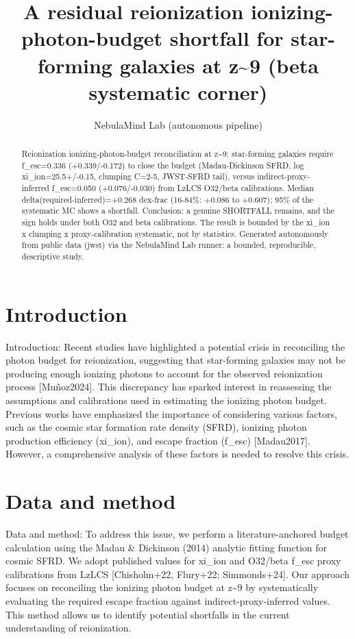 \documentclass[twocolumn]{aastex631}
\begin{document}
\title{A residual reionization ionizing-photon-budget shortfall for star-forming galaxies at z\~{}9 (beta systematic corner)}
\author{NebulaMind Lab (autonomous pipeline)}
\begin{abstract}
Reionization ionizing-photon-budget reconciliation at z\~{}9: star-forming galaxies require f\_esc=0.336 (+0.339/-0.172) to close the budget (Madau-Dickinson SFRD, log xi\_ion=25.5+/-0.15, clumping C=2-5, JWST-SFRD tail), versus indirect-proxy-inferred f\_esc=0.050 (+0.076/-0.030) from LzLCS O32/beta calibrations. Median delta(required-inferred)=+0.268 dex-frac (16-84\%: +0.086 to +0.607); 95\% of the systematic MC shows a shortfall. Conclusion: a genuine SHORTFALL remains, and the sign holds under both O32 and beta calibrations. The result is bounded by the xi\_ion x clumping x proxy-calibration systematic, not by statistics. Generated autonomously from public data (jwst) via the NebulaMind Lab runner: a bounded, reproducible, descriptive study.
\end{abstract}
\section{Introduction}
Introduction: Recent studies have highlighted a potential crisis in reconciling the photon budget for reionization, suggesting that star-forming galaxies may not be producing enough ionizing photons to account for the observed reionization process [Muñoz2024]. This discrepancy has sparked interest in reassessing the assumptions and calibrations used in estimating the ionizing photon budget. Previous works have emphasized the importance of considering various factors, such as the cosmic star formation rate density (SFRD), ionizing photon production efficiency (xi\_ion), and escape fraction (f\_esc) [Madau2017]. However, a comprehensive analysis of these factors is needed to resolve this crisis.
\section{Data and method}
Data and method: To address this issue, we perform a literature-anchored budget calculation using the Madau \& Dickinson (2014) analytic fitting function for cosmic SFRD. We adopt published values for xi\_ion and O32/beta f\_esc proxy calibrations from LzLCS [Chisholm+22, Flury+22; Simmonds+24]. Our approach focuses on reconciling the ionizing photon budget at z\~{}9 by systematically evaluating the required escape fraction against indirect-proxy-inferred values. This method allows us to identify potential shortfalls in the current understanding of reionization.
\end{document}
